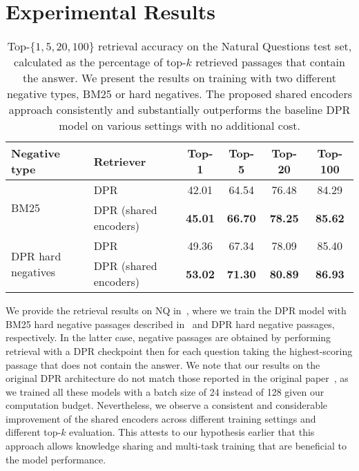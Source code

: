 \section{Experimental Results}\label{sec:shared_encoders_results}


\begin{table*}[t!]
	\setlength\tabcolsep{5pt}
	\centering
	\small
	\begin{tabular}{ll|cccc}
		\toprule
		\textbf{Negative type} & \textbf{Retriever}
		& Top-1 & Top-5 & Top-20 & Top-100 \\ 
		\midrule
		\multirow{2}{*}{BM25} & DPR & 42.01 & 64.54 & 76.48 & 84.29 \\
		&DPR (shared encoders) & \textbf{45.01} & \textbf{66.70} & \textbf{78.25} & \textbf{85.62} \\
		\midrule
		\multirow{2}{*}{DPR hard negatives} & DPR & 49.36 & 67.34 & 78.09 & 85.40 \\
		& DPR (shared encoders) & \textbf{53.02} & \textbf{71.30} & \textbf{80.89} & \textbf{86.93} \\
		\bottomrule
	\end{tabular}
	\caption[Top-$\{1, 5, 20, 100\}$ retrieval accuracy on the Natural Questions test set of the DPR retriever with and without parameter sharing.]{
		Top-$\{1, 5, 20, 100\}$ retrieval accuracy on the Natural Questions test set, calculated as the percentage of top-$k$ retrieved passages that contain the answer.
		We present the results on training with two different negative types, BM25 or hard negatives.
		The proposed shared encoders approach consistently and substantially outperforms the baseline DPR model on various settings with no additional cost.	
}
	
	\label{tab:shared_encoders_results}
\end{table*}


We provide the retrieval results on NQ in~, where we train the DPR model with BM25 hard negative passages described in~ and DPR hard negative passages, respectively.
%
In the latter case, negative passages are obtained by performing retrieval with a DPR checkpoint then for each question taking the highest-scoring passage that does not contain the answer.
%
We note that our results on the original DPR architecture do not match those reported in the original paper~\cite{karpukhin2020dense}, as we trained all these models with a batch size of 24 instead of 128 given our computation budget.
%
Nevertheless, we observe a consistent and considerable improvement of the shared encoders across different training settings and different top-$k$ evaluation.
%
This attests to our hypothesis earlier that this approach allows knowledge sharing and multi-task training that are beneficial to the model performance.

